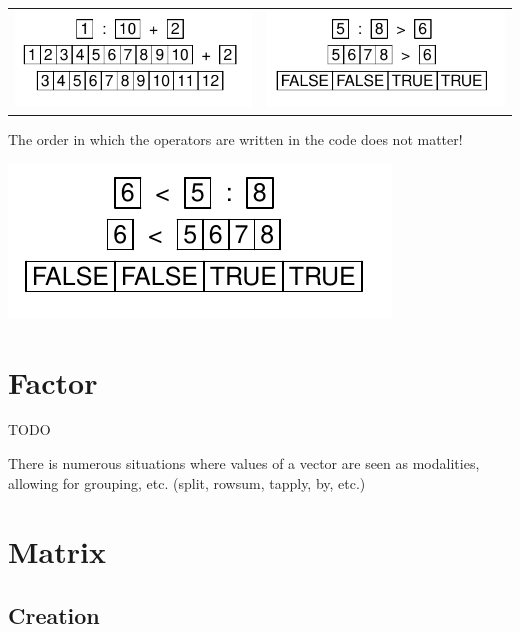 \documentclass[pdflatex]{article}
\begin{document}
\begin{tabular}{cc}
\includegraphics{precedence} & \includegraphics{operator_gt}\\
\end{tabular}

The order in which the operators are written in the code does not matter!

\includegraphics{operator_gt_inv}

\section{Factor}

TODO

There is numerous situations where values of a vector are seen as modalities, allowing for grouping, etc. (split, rowsum, tapply, by, etc.)

\section{Matrix}

\subsection{Creation}
\end{document}
